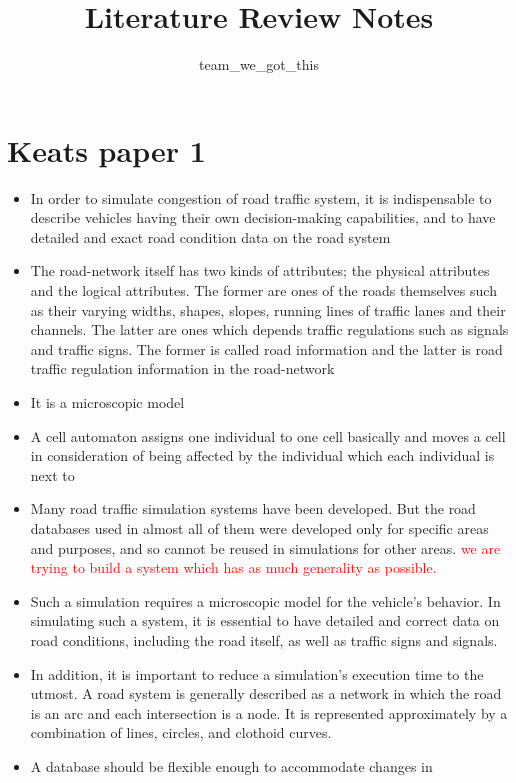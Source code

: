 \documentclass[]{article}
\title{Literature Review Notes}
\author{team\_we\_got\_this}
\begin{document}
\maketitle


\section*{Keats paper 1}
	\begin{itemize}
		\item  In order to simulate congestion of road traffic system, it is indispensable to describe vehicles having their own decision-making capabilities, and to have detailed and exact road condition data on the road system
		\item The road-network itself has two kinds of attributes; the physical attributes and the logical attributes.
		 The former are ones of the roads themselves such as their varying widths, shapes, slopes, running lines of traffic lanes and their channels. 
		 The latter are ones which depends traffic regulations such as signals and traffic signs. 
		 The former is called road information and the latter is road traffic regulation information in the road-network
		 \item It is a microscopic model 
		 \item A cell automaton assigns one individual to one cell basically and moves a cell in consideration of being affected by the individual which each individual is next to
		 \item Many road traffic simulation systems have been developed. But the road databases used in almost all of them were developed only for specific areas and purposes, and so cannot be reused in simulations for other areas. \textcolor{red}{we are trying to build a system which has as much generality as possible.} \cite{namekawa2005general}
		 \item Such a simulation requires a microscopic model for the vehicle's behavior. In simulating such a system, it is essential to have detailed and correct data on road conditions, including the road itself, as well as  traffic signs and signals.
		 \item In addition, it is
		 important to reduce a simulation’s execution time to the utmost. A road system is generally described as a network in which the road is an arc and each intersection is a node. It is represented approximately by a combination of lines, circles, and clothoid curves.
		 \item A database should
		 be flexible enough to accommodate changes in

\end{itemize}
\end{document}
